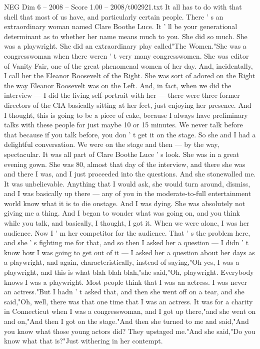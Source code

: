 \begin{textsample}{NEG Dim 6 – 2008 – Score 1.00 – 2008/t002921.txt}
It all has to do with that shell that most of us have, and particularly certain people.
There ' s an extraordinary woman named Clare Boothe Luce.
It ' ll be your generational determinant as to whether her name means much to you.
She did so much.
She was a playwright.
She did an extraordinary play called"The Women."She was a congresswoman when there weren ' t very many congresswomen.
She was editor of Vanity Fair, one of the great phenomenal women of her day.
And, incidentally, I call her the Eleanor Roosevelt of the Right.
She was sort of adored on the Right the way Eleanor Roosevelt was on the Left.
And, in fact, when we did the interview — I did the living self-portrait with her — there were three former directors of the CIA basically sitting at her feet, just enjoying her presence.
And I thought, this is going to be a piece of cake, because I always have preliminary talks with these people for just maybe 10 or 15 minutes.
We never talk before that because if you talk before, you don ' t get it on the stage.
So she and I had a delightful conversation.
We were on the stage and then — by the way, spectacular.
It was all part of Clare Boothe Luce ' s look.
She was in a great evening gown.
She was 80, almost that day of the interview, and there she was and there I was, and I just proceeded into the questions.
And she stonewalled me.
It was unbelievable.
Anything that I would ask, she would turn around, dismiss, and I was basically up there — any of you in the moderate-to-full entertainment world know what it is to die onstage.
And I was dying.
She was absolutely not giving me a thing.
And I began to wonder what was going on, and you think while you talk, and basically, I thought, I got it.
When we were alone, I was her audience.
Now I ' m her competitor for the audience.
That ' s the problem here, and she ' s fighting me for that, and so then I asked her a question — I didn ' t know how I was going to get out of it — I asked her a question about her days as a playwright, and again, characteristically, instead of saying,"Oh yes, I was a playwright, and this is what blah blah blah,"she said,"Oh, playwright.
Everybody knows I was a playwright.
Most people think that I was an actress.
I was never an actress."But I hadn ' t asked that, and then she went off on a tear, and she said,"Oh, well, there was that one time that I was an actress.
It was for a charity in Connecticut when I was a congresswoman, and I got up there,"and she went on and on,"And then I got on the stage."And then she turned to me and said,"And you know what those young actors did?
They upstaged me."And she said,"Do you know what that is?"Just withering in her contempt.

\end{textsample}
